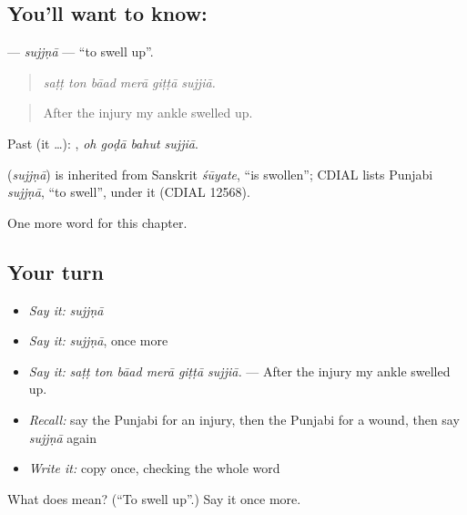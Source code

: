 \subsection*{You'll want to know: }
\textbf{} — \emph{sujjṇā} — \textquotedblleft{}to swell up\textquotedblright{}.

\begin{quote}
     
\end{quote}

\begin{quote}
\emph{saṭṭ ton bāad merā giṭṭā sujjiā.}
\end{quote}

\begin{quote}
After the injury my ankle swelled up.
\end{quote}

Past (it …):    , \emph{oh goḍā bahut sujjiā}.

\begin{cousinweb}
\textbf{} (\emph{sujjṇā}) is inherited from Sanskrit \emph{śūyate}, \textquotedblleft{}is swollen\textquotedblright{}; CDIAL lists Punjabi \emph{sujjṇā}, \textquotedblleft{}to swell\textquotedblright{}, under it (CDIAL 12568).
\end{cousinweb}

\begin{grammarlens}[title={What you've built}]
One more word for this chapter.
\end{grammarlens}

\subsection*{Your turn}
\begin{itemize}
\raggedright
  \item \emph{Say it:} \emph{sujjṇā}
  \item \emph{Say it:} \emph{sujjṇā}, once more
  \item \emph{Say it:} \emph{saṭṭ ton bāad merā giṭṭā sujjiā.} — After the injury my ankle swelled up.
  \item \emph{Recall:} say the Punjabi for an injury, then the Punjabi for a wound, then say \emph{sujjṇā} again
  \item \emph{Write it:} copy \textbf{} once, checking the whole word
\end{itemize}

\begin{tcolorbox}[breakable,colback=teal!4,colframe=teal!35!black,title={Before you move on}]
What does  mean? (\textquotedblleft{}To swell up\textquotedblright{}.) Say it once more.
\end{tcolorbox}
